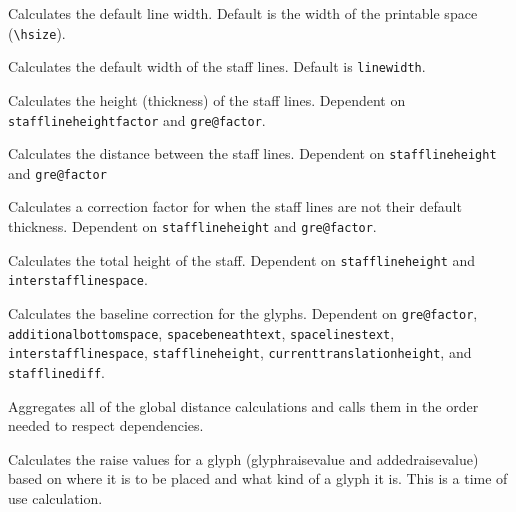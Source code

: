 Calculates the default line width.  Default is the width of the printable space (\verb=\hsize=).

Calculates the default width of the staff lines.  Default is \texttt{linewidth}.

Calculates the height (thickness) of the staff lines.  Dependent on \texttt{stafflineheightfactor} and \texttt{gre@factor}.

Calculates the distance between the staff lines.  Dependent on \texttt{stafflineheight} and \texttt{gre@factor}

Calculates a correction factor for when the staff lines are not their default thickness.  Dependent on \texttt{stafflineheight} and \texttt{gre@factor}.

Calculates the total height of the staff.  Dependent on \texttt{stafflineheight} and \texttt{interstafflinespace}.

Calculates the baseline correction for the glyphs.  Dependent on \texttt{gre@factor}, \texttt{additionalbottomspace}, \texttt{spacebeneathtext}, \texttt{spacelinestext}, \texttt{interstafflinespace}, \texttt{stafflineheight}, \texttt{currenttranslationheight}, and \texttt{stafflinediff}.

Aggregates all of the global distance calculations and calls them in the order needed to respect dependencies.

Calculates the raise values for a glyph (glyphraisevalue and addedraisevalue) based on where it is to be placed and what kind of a glyph it is.  This is a time of use calculation.

